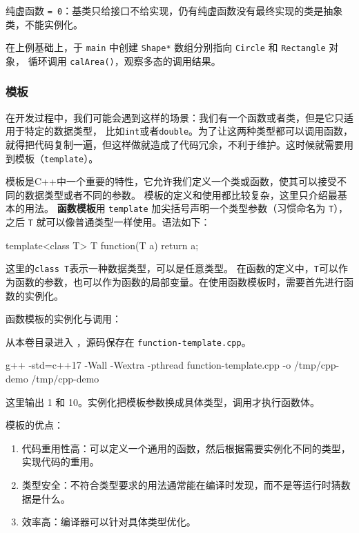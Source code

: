 \begin{conclusion}
纯虚函数 \texttt{= 0}：基类只给接口不给实现，仍有纯虚函数没有最终实现的类是抽象类，不能实例化。
\end{conclusion}

\begin{exercise}\label{ex:v1-cpp-inheritance}

在上例基础上，于 \texttt{main} 中创建 \texttt{Shape*} 数组分别指向 \texttt{Circle} 和 \texttt{Rectangle} 对象，
循环调用 \texttt{calArea()}，观察多态的调用结果。
\end{exercise}

 \subsubsection{模板}
在开发过程中，我们可能会遇到这样的场景：我们有一个函数或者类，但是它只适用于特定的数据类型，
比如\texttt{int}或者\texttt{double}。为了让这两种类型都可以调用函数，
就得把代码复制一遍，但这样做就造成了代码冗余，不利于维护。这时候就需要用到模板（\texttt{template}）。

模板是C++中一个重要的特性，它允许我们定义一个类或函数，使其可以接受不同的数据类型或者不同的参数。
模板的定义和使用都比较复杂，这里只介绍最基本的用法。
\textbf{函数模板}用 \texttt{template} 加尖括号声明一个类型参数（习惯命名为 \texttt{T}），之后 \texttt{T} 就可以像普通类型一样使用。语法如下：
\begin{tcode}
template<class T>
T function(T a){
    return a;
}
\end{tcode}

这里的\texttt{class T}表示一种数据类型，可以是任意类型。
在函数的定义中，\texttt{T}可以作为函数的参数，也可以作为函数的局部变量。在使用函数模板时，需要首先进行函数的实例化。

\begin{example}
函数模板的实例化与调用：



从本卷目录进入 ，源码保存在 \texttt{function-template.cpp}。
\begin{tbash}
g++ -std=c++17 -Wall -Wextra -pthread function-template.cpp -o /tmp/cpp-demo
/tmp/cpp-demo
\end{tbash}
这里输出 1 和 10。实例化把模板参数换成具体类型，调用才执行函数体。
\end{example}

模板的优点：
\begin{enumerate}
    \item 代码重用性高：可以定义一个通用的函数，然后根据需要实例化不同的类型，实现代码的重用。
    \item 类型安全：不符合类型要求的用法通常能在编译时发现，而不是等运行时猜数据是什么。
    \item 效率高：编译器可以针对具体类型优化。
\end{enumerate}

